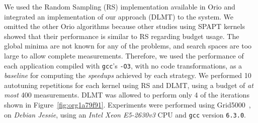 \documentclass[conference]{IEEEtran}
\begin{document}
We used the Random Sampling (RS) implementation available in Orio and integrated
an implementation of our approach (DLMT) to the system. We omitted the other
Orio algorithms because other studies using SPAPT
kernels~\cite{balaprakash2011can,balaprakash2012experimental} showed that
their performance is similar to RS regarding budget usage. The global minima are
not known for any of the problems, and search spaces are too large to allow
complete measurements. Therefore, we used the performance of each application
compiled with \texttt{gcc}'s \texttt{-O3}, with no code transformations, as a
\emph{baseline} for computing the \emph{speedups} achieved by each strategy. We performed
10 autotuning repetitions for each kernel using RS and DLMT, using a budget of
\emph{at most} 400 measurements. DLMT was allowed to perform only 4 of the iterations
shown in Figure~\ref{fig:org1a79f91}. Experiments were performed using
Grid5000~\cite{balouek2013adding}, on \emph{Debian Jessie}, using an \emph{Intel
Xeon E5-2630v3} CPU and \texttt{gcc} version \texttt{6.3.0}.
\end{document}
